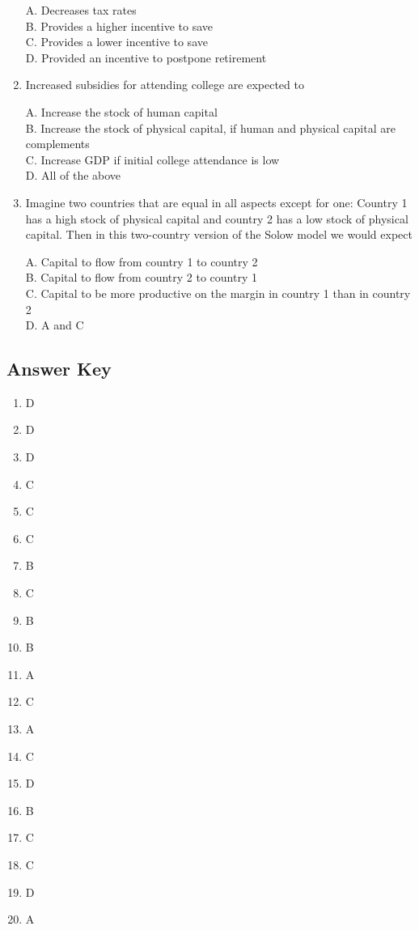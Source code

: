 \documentclass[
]{book}
\providecommand{\tightlist}{%
  \setlength{\itemsep}{0pt}\setlength{\parskip}{0pt}}
\begin{document}
\begin{enumerate}
  A. Decreases tax rates\\
  B. Provides a higher incentive to save\\
  C. Provides a lower incentive to save\\
  D. Provided an incentive to postpone retirement
\item
  Increased subsidies for attending college are expected to

  A. Increase the stock of human capital\\
  B. Increase the stock of physical capital, if human and physical capital are complements\\
  C. Increase GDP if initial college attendance is low\\
  D. All of the above
\item
  Imagine two countries that are equal in all aspects except for one: Country 1 has a high stock of physical capital and country 2 has a low stock of physical capital. Then in this two-country version of the Solow model we would expect

  A. Capital to flow from country 1 to country 2\\
  B. Capital to flow from country 2 to country 1\\
  C. Capital to be more productive on the margin in country 1 than in country 2\\
  D. A and C
\end{enumerate}

\hypertarget{answer-key-1}{%
\subsection{Answer Key}\label{answer-key-1}}

\begin{enumerate}
\def\labelenumi{\arabic{enumi}.}
\tightlist
\item
  D
\item
  D
\item
  D
\item
  C
\item
  C
\item
  C
\item
  B
\item
  C
\item
  B
\item
  B
\item
  A
\item
  C
\item
  A
\item
  C
\item
  D
\item
  B
\item
  C
\item
  C
\item
  D
\item
  A
\end{enumerate}
\end{document}
